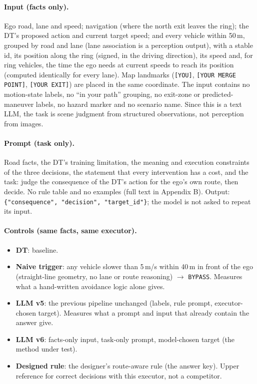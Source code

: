 \documentclass[11pt]{article}
\newenvironment{revblock}{\color{red}}{}
\begin{document}
\begin{revblock}
\paragraph{Input (facts only).} Ego road, lane and speed; navigation (where the north exit leaves the ring); the DT's
proposed action and current target speed; and every vehicle within 50\,m, grouped by road and lane (lane association
is a perception output), with a stable id, its position along the ring (signed, in the driving direction), its speed
and, for ring vehicles, the time the ego needs at current speeds to reach its position (computed identically for every
lane). Map landmarks (\texttt{[YOU]}, \texttt{[YOUR MERGE POINT]}, \texttt{[YOUR EXIT]}) are placed in the same
coordinate. The input contains no motion-state labels, no ``in your path'' grouping, no exit-zone or predicted-maneuver
labels, no hazard marker and no scenario name. Since this is a text LLM, the task is scene judgment from structured
observations, not perception from images.

\paragraph{Prompt (task only).} Road facts, the DT's training limitation, the meaning and execution constraints of the
three decisions, the statement that every intervention has a cost, and the task: judge the consequence of the DT's
action for the ego's own route, then decide. No rule table and no examples (full text in Appendix B).
Output: \texttt{\{"consequence", "decision", "target\_id"\}}; the model is not asked to repeat its input.

\paragraph{Controls (same facts, same executor).}
\begin{itemize}[nosep]
\item \textbf{DT}: baseline.
\item \textbf{Naive trigger}: any vehicle slower than 5\,m/s within 40\,m in front of the ego (straight-line geometry,
  no lane or route reasoning) $\rightarrow$ \texttt{BYPASS}. Measures what a hand-written avoidance logic alone gives.
\item \textbf{LLM v5}: the previous pipeline unchanged (labels, rule prompt, executor-chosen target). Measures what a
  prompt and input that already contain the answer give.
\item \textbf{LLM v6}: facts-only input, task-only prompt, model-chosen target (the method under test).
\item \textbf{Designed rule}: the designer's route-aware rule (the answer key). Upper reference for correct decisions
  with this executor, not a competitor.
\end{itemize}


\end{revblock}
\end{document}
